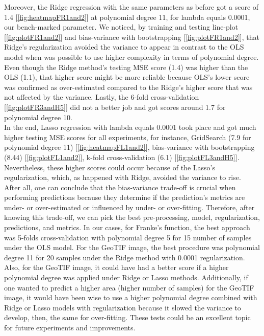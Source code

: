Moreover, the Ridge regression with the same parameters as before got a score of 1.4 [\ref{fig:heatmapFR1and2}] at polynomial degree 11, for lambda equals 0.0001, our bench-marked parameter. We noticed, by training and testing line-plot [\ref{fig:plotFR1and2}] and bias-variance with bootstrapping [\ref{fig:plotFR1and2}], that Ridge's regularization avoided the variance to appear in contrast to the OLS model when was possible to use higher complexity in terms of polynomial degree. Even though the Ridge method's testing MSE score (1.4) was higher than the OLS (1.1), that higher score might be more reliable because OLS's lower score was confirmed as over-estimated compared to the Ridge's higher score that was not affected by the variance. Lastly, the 6-fold cross-validation [\ref{fig:plotFR3andH5}] did not a better job and got scores around 1.7 for polynomial degree 10.\\

In the end, Lasso regression with lambda equals 0.0001 took place and got much higher testing MSE scores for all experiments, for instance, GridSearch (7.9 for polynomial degree 11) [\ref{fig:heatmapFL1and2}], bias-variance with bootstrapping (8.44) [\ref{fig:plotFL1and2}], k-fold cross-validation (6.1) [\ref{fig:plotFL3andH5}]. Nevertheless, these higher scores could occur because of the Lasso's regularization, which, as happened with Ridge, avoided the variance to rise.\\

After all, one can conclude that the bias-variance trade-off is crucial when performing predictions because they determine if the prediction's metrics are under- or over-estimated or influenced by under- or over-fitting. Therefore, after knowing this trade-off, we can pick the best pre-processing, model, regularization, predictions, and metrics. In our cases, for Franke's function, the best approach was 5-folds cross-validation with polynomial degree 5 for 15 number of samples under the OLS model. For the GeoTIF image, the best procedure was polynomial degree 11 for 20 samples under the Ridge method with 0.0001 regularization. Also, for the GeoTIF image, it could have had a better score if a higher polynomial degree was applied under Ridge or Lasso methods. Additionally, if one wanted to predict a higher area (higher number of samples) for the GeoTIF image, it would have been wise to use a higher polynomial degree combined with Ridge or Lasso models with regularization because it slowed the variance to develop, then, the same for over-fitting. These tests could be an excellent topic for future experiments and improvements.\\
